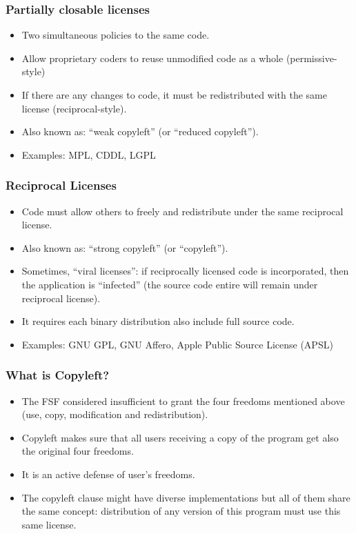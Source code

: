 
\begin{frame}
\frametitle{Partially closable licenses}

\begin{itemize}
\item Two simultaneous policies to the same code.
\item Allow proprietary coders to reuse unmodified code as a whole (permissive-style)
\item If there are any changes to code, it must be redistributed with the same license (reciprocal-style).
\item Also known as: ``weak copyleft'' (or ``reduced copyleft''). 
\item Examples: MPL, CDDL, LGPL
\end{itemize}

\end{frame}


\begin{frame}
\frametitle{Reciprocal Licenses}

\begin{itemize}
\item Code must allow others to freely and redistribute under the same reciprocal license.
\item Also known as: ``strong copyleft'' (or ``copyleft''). 
\item Sometimes, ``viral licenses'': if reciprocally licensed code is incorporated, then the application is ``infected'' (the source code entire will remain under reciprocal license).  
\item It requires each binary distribution also include full source code.
\item Examples: GNU GPL, GNU Affero, Apple Public Source License (APSL)
\end{itemize}

\end{frame}

\begin{frame}
\frametitle{What is Copyleft?}
\begin{itemize}
    \item The FSF considered insufficient to grant the four freedoms mentioned above (use, copy, modification and redistribution).         
    \item Copyleft makes sure that all users receiving a copy of the program get also the original four freedoms.
    \item It is an active defense of user's freedoms. 
    \item The \alert{copyleft clause} might have diverse implementations but all of them share the same concept: \alert{distribution of any version of this program must use this same license.}

\end{itemize}

\end{frame}



